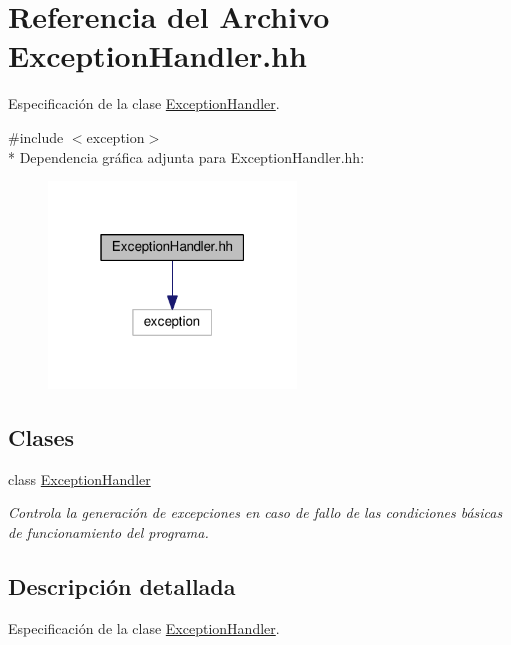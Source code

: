 \hypertarget{_exception_handler_8hh}{}\section{Referencia del Archivo Exception\+Handler.\+hh}
\label{_exception_handler_8hh}


Especificación de la clase \hyperlink{class_exception_handler}{Exception\+Handler}.  


{\ttfamily \#include $<$exception$>$}\\*
Dependencia gráfica adjunta para Exception\+Handler.\+hh\+:\nopagebreak
\begin{figure}[H]
\begin{center}
\leavevmode
\includegraphics[width=187pt]{_exception_handler_8hh__incl}
\end{center}
\end{figure}
\subsection*{Clases}
\begin{DoxyCompactItemize}
\item 
class \hyperlink{class_exception_handler}{Exception\+Handler}
\begin{DoxyCompactList}\small\item\em Controla la generación de excepciones en caso de fallo de las condiciones básicas de funcionamiento del programa. \end{DoxyCompactList}\end{DoxyCompactItemize}


\subsection{Descripción detallada}
Especificación de la clase \hyperlink{class_exception_handler}{Exception\+Handler}. 

